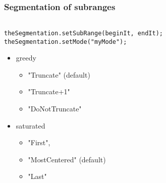 \begin{frame}[fragile]
  \frametitle{Segmentation of subranges}

\begin{verbatim}

theSegmentation.setSubRange(beginIt, endIt);
theSegmentation.setMode("myMode");

\end{verbatim}

\begin{itemize}
 \item greedy
  \begin{itemize}
   \item "Truncate" (default)
   \item "Truncate+1"
   \item "DoNotTruncate"
  \end{itemize}
 \item saturated
  \begin{itemize}
   \item "First",
   \item "MostCentered" (default)
   \item "Last"
  \end{itemize}
\end{itemize}


\end{frame}
